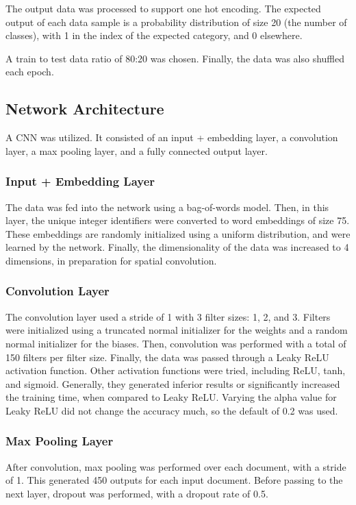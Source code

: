 \documentclass{article}
\begin{document}
The output data was processed to support one hot encoding. The expected output of each data sample is a probability distribution of size
20 (the number of classes), with 1 in the index of the expected category, and 0 elsewhere.

A train to test data ratio of 80:20 was chosen. Finally, the data was also shuffled each epoch.

\subsection{Network Architecture}
A CNN was utilized. It consisted of an input + embedding layer, a convolution layer, a max pooling layer, and a fully connected output layer.

\subsubsection{Input + Embedding Layer}
The data was fed into the network using a bag-of-words model. Then, in this layer, the unique integer identifiers were
converted to word embeddings of size 75. These embeddings are randomly initialized using a uniform distribution, and were learned by the
network. Finally, the dimensionality of the data was increased to 4 dimensions, in preparation for spatial convolution.

\subsubsection{Convolution Layer}
The convolution layer used a stride of 1 with 3 filter sizes: 1, 2, and 3. Filters were initialized using a truncated normal initializer for
the weights and a random normal initializer for the biases. Then, convolution was performed with a total of 150 filters
per filter size. Finally, the data was passed through a Leaky ReLU activation function. Other activation functions were tried,
including ReLU, tanh, and sigmoid. Generally, they generated inferior results or significantly increased the training time, when compared
to Leaky ReLU. Varying the alpha value for Leaky ReLU did not change the accuracy much, so the default of 0.2 was used.

\subsubsection{Max Pooling Layer}
After convolution, max pooling was performed over each document, with a stride of 1. This generated 450 outputs for each input document.
Before passing to the next layer, dropout was performed, with a dropout rate of 0.5.
\end{document}
